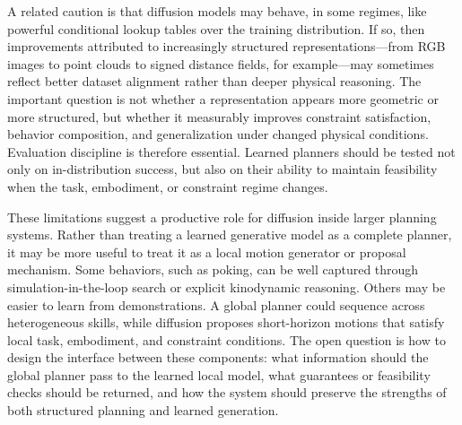 A related caution is that diffusion models may behave, in some regimes, like powerful conditional lookup tables over the training distribution.
If so, then improvements attributed to increasingly structured representations---from RGB images to point clouds to signed distance fields, for example---may sometimes reflect better dataset alignment rather than deeper physical reasoning.
The important question is not whether a representation appears more geometric or more structured, but whether it measurably improves constraint satisfaction, behavior composition, and generalization under changed physical conditions.
Evaluation discipline is therefore essential.
Learned planners should be tested not only on in-distribution success, but also on their ability to maintain feasibility when the task, embodiment, or constraint regime changes.

These limitations suggest a productive role for diffusion inside larger planning systems.
Rather than treating a learned generative model as a complete planner, it may be more useful to treat it as a local motion generator or proposal mechanism.
Some behaviors, such as poking, can be well captured through simulation-in-the-loop search or explicit kinodynamic reasoning.
Others may be easier to learn from demonstrations.
A global planner could sequence across heterogeneous skills, while diffusion proposes short-horizon motions that satisfy local task, embodiment, and constraint conditions.
The open question is how to design the interface between these components: what information should the global planner pass to the learned local model, what guarantees or feasibility checks should be returned, and how the system should preserve the strengths of both structured planning and learned generation.
